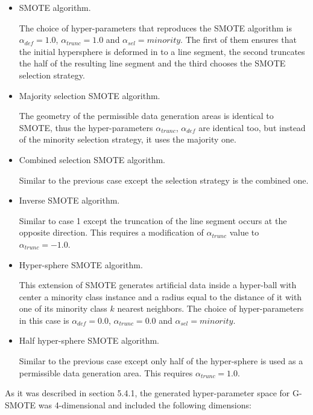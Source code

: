 \documentclass[parskip=full]{scrartcl}
\begin{document}
\begin{itemize}
	
	\renewcommand\labelitemi{--}

	\item SMOTE algorithm.

	The choice of hyper-parameters that reproduces the SMOTE algorithm is \(
	\alpha_{def} = 1.0 \), \( \alpha_{trunc} = 1.0 \) and \( \alpha_{sel} =
	minority \). The first of them ensures that the initial hypersphere is
	deformed in to a line segment, the second truncates the half of the
	resulting line segment and the third chooses the SMOTE selection strategy.

	\item Majority selection SMOTE algorithm.

	The geometry of the permissible data generation areas is identical to SMOTE,
	thus the hyper-parameters \( \alpha_{trunc} \), \( \alpha_{def} \) are
	identical too, but instead of the minority selection strategy, it uses the
	majority one.

	\item Combined selection SMOTE algorithm.

	Similar to the previous case except the selection strategy is the combined
	one.

	\item Inverse SMOTE algorithm.

	Similar to case 1 except the truncation of the line segment occurs at the
	opposite direction. This requires a modification of \( \alpha_{trunc} \)
	value to \( \alpha_{trunc} = -1.0 \).

	\item Hyper-sphere SMOTE algorithm.

	This extension of SMOTE generates artificial data inside a hyper-ball with
	center a minority class instance and a radius equal to the distance of it
	with one of its minority class \( k \) nearest neighbors. The choice of
	hyper-parameters in this case is \( \alpha_{def} = 0.0 \), \( \alpha_{trunc}
	= 0.0 \) and \( \alpha_{sel} = minority \).

	\item Half hyper-sphere SMOTE algorithm.

	Similar to the previous case except only half of the hyper-sphere is used as
	a permissible data generation area. This requires \( \alpha_{trunc} = 1.0
	\).

\end{itemize}

As it was described in section 5.4.1, the generated hyper-parameter space for
G-SMOTE was 4-dimensional and included the following dimensions:
\end{document}
